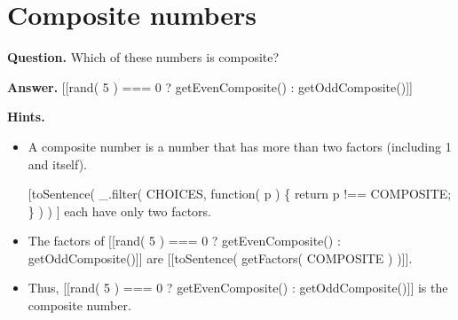 \documentclass{article}
\begin{document}
\section*{Composite numbers}
\textbf{Question.} Which of these numbers is composite?

\textbf{Answer.} [[rand( 5 ) === 0 ? getEvenComposite() : getOddComposite()]]

\textbf{Hints.}
\begin{itemize}
  \item A composite number is a number that has more than two factors (including 1 and itself).
  \item [[toSentence( \_.filter( CHOICES, function( p ) \{ return p !== COMPOSITE; \} ) )]] each have only two factors.
  \item The factors of [[rand( 5 ) === 0 ? getEvenComposite() : getOddComposite()]] are [[toSentence( getFactors( COMPOSITE ) )]].
  \item Thus, [[rand( 5 ) === 0 ? getEvenComposite() : getOddComposite()]] is the composite number.
\end{itemize}
\end{document}

